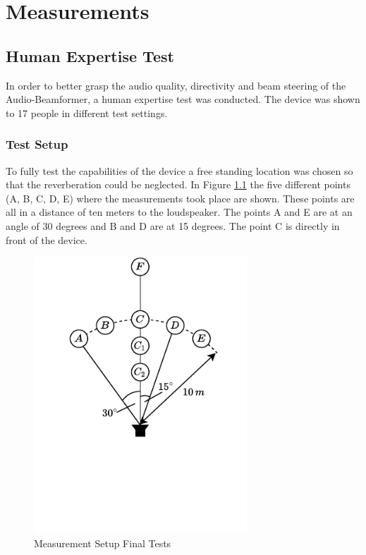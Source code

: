 \chapter{Measurements}
\section{Human Expertise Test}\label{6_sec:expertise_test}
In order to better grasp the audio quality, directivity and beam steering of the Audio-Beamformer, a human expertise test was conducted. The device was shown to 17 people in different test settings.   
\subsection{Test Setup}
To fully test the capabilities of the device a free standing location was chosen so that the reverberation could be neglected. In Figure \ref{6_fig:measurement_setup_final} the five different points (A, B, C, D, E) where the measurements took place are shown. These points are all in a distance of ten meters to the loudspeaker. The points A and E are at an angle of 30 degrees and B and D are at 15 degrees. The point C is directly in front of the device.

\bigskip
\begin{figure}[h!]
    \centering
    \includegraphics[width=8cm, trim=0mm 22mm 0mm 0mm]{images/6_Measurements/MeasurementSetup.pdf}
    \caption{Measurement Setup Final Tests}
    \label{6_fig:measurement_setup_final}
\end{figure}
\newpage

